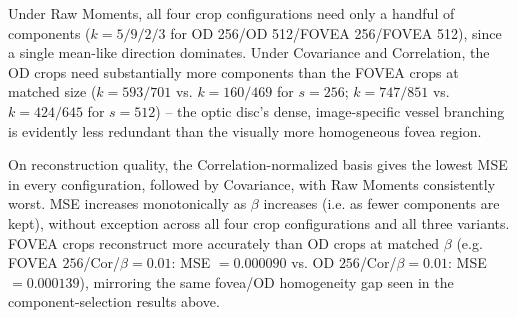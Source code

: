 \documentclass[a4paper,11pt]{article}
\begin{document}
Under Raw Moments, all four crop configurations need only a handful of
components ($k=5/9/2/3$ for OD 256/OD 512/FOVEA 256/FOVEA 512), since a
single mean-like direction dominates. Under Covariance and Correlation, the
OD crops need substantially more components than the FOVEA crops at matched
size ($k=593/701$ vs. $k=160/469$ for $s=256$; $k=747/851$ vs. $k=424/645$
for $s=512$) -- the optic disc's dense, image-specific vessel branching is
evidently less redundant than the visually more homogeneous fovea region.

On reconstruction quality, the Correlation-normalized basis gives the
lowest MSE in every configuration, followed by Covariance, with Raw Moments
consistently worst. MSE increases monotonically as $\beta$ increases (i.e.
as fewer components are kept),
without exception across all four crop configurations and all three
variants. FOVEA crops reconstruct more accurately than OD crops at matched
$\beta$ (e.g. FOVEA $256$/Cor/$\beta=0.01$: MSE $=0.000090$ vs. OD
$256$/Cor/$\beta=0.01$: MSE $=0.000139$), mirroring the same fovea/OD
homogeneity gap seen in the component-selection results above.
\end{document}
